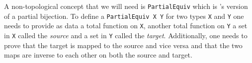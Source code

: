 A non-topological concept that we will need is \lstinline|PartialEquiv| which is \mathlib's version of a partial bijection. 
To define a \lstinline|PartialEquiv X Y| for two types \lstinline|X| and \lstinline|Y| one needs to provide as data a total function on \lstinline|X|, another total function on \lstinline|Y| a set in \lstinline|X| called the \emph{source} and a set in \lstinline|Y| called the \emph{target}. 
Additionally, one needs to prove that the target is mapped to the source and vice versa and that the two maps are inverse to each other on both the source and target. 
